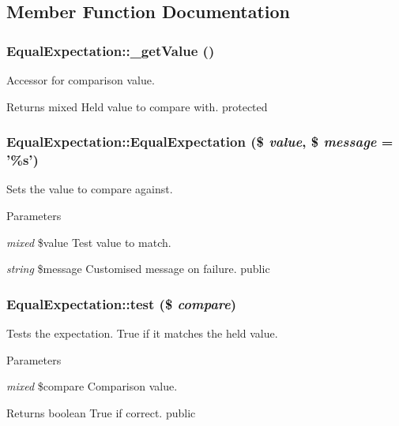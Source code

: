 \subsection{Member Function Documentation}
\hypertarget{class_equal_expectation_a60ce0cd029990b304408f0a73edfb93e}{
\subsubsection[{\_\-getValue}]{\setlength{\rightskip}{0pt plus 5cm}EqualExpectation::\_\-getValue ()}}
\label{class_equal_expectation_a60ce0cd029990b304408f0a73edfb93e}
Accessor for comparison value. \begin{DoxyReturn}{Returns}
mixed Held value to compare with.  protected 
\end{DoxyReturn}
\hypertarget{class_equal_expectation_a13f738ba95ce51f758a18775a16e2e17}{
\subsubsection[{EqualExpectation}]{\setlength{\rightskip}{0pt plus 5cm}EqualExpectation::EqualExpectation (\$ {\em value}, \/  \$ {\em message} = {\ttfamily '\%s'})}}
\label{class_equal_expectation_a13f738ba95ce51f758a18775a16e2e17}
Sets the value to compare against. 
\begin{DoxyParams}{Parameters}
\item[{\em mixed}]\$value Test value to match. \item[{\em string}]\$message Customised message on failure.  public \end{DoxyParams}
\hypertarget{class_equal_expectation_a412b216b1ba36e37d342aebb821ccb55}{
\subsubsection[{test}]{\setlength{\rightskip}{0pt plus 5cm}EqualExpectation::test (\$ {\em compare})}}
\label{class_equal_expectation_a412b216b1ba36e37d342aebb821ccb55}
Tests the expectation. True if it matches the held value. 
\begin{DoxyParams}{Parameters}
\item[{\em mixed}]\$compare Comparison value. \end{DoxyParams}
\begin{DoxyReturn}{Returns}
boolean True if correct.  public 
\end{DoxyReturn}


